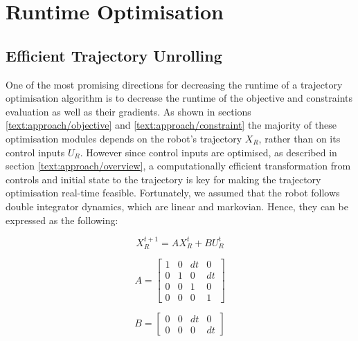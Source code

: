 
\section{Runtime Optimisation}
\label{text:approach/runtime}

\subsection{Efficient Trajectory Unrolling}
\label{text:approach/runtime/unrolling}
One of the most promising directions for decreasing the runtime of a trajectory optimisation algorithm is to decrease the runtime of the objective and constraints evaluation as well as their gradients. As shown in sections \ref{text:approach/objective} and \ref{text:approach/constraint} the majority of these optimisation modules depends on the robot's trajectory $X_R$, rather than on its control inputs $U_R$. However since control inputs are optimised, as described in section \ref{text:approach/overview}, a computationally efficient transformation from controls and initial state to the trajectory is key for making the trajectory optimisation real-time feasible.
\newline
Fortunately, we assumed that the robot follows double integrator dynamics, which are linear and markovian. Hence, they can be expressed as the following: 

\begin{equation}
X_R^{t+1} = A X_R^t + B U_R^t
\label{eq:dynamics}
\end{equation}

\begin{minipage}{0.5\textwidth}
$$A = \begin{bmatrix} 1 & 0 & dt & 0 \\ 0 & 1 & 0 & dt \\ 0 & 0 & 1 & 0 \\ 0 & 0 & 0 & 1\end{bmatrix}$$
\end{minipage}
\begin{minipage}{0.5\textwidth}
$$B = \begin{bmatrix} 0 & 0 & dt & 0 \\ 0 & 0 & 0 & dt \end{bmatrix}$$
\end{minipage}

